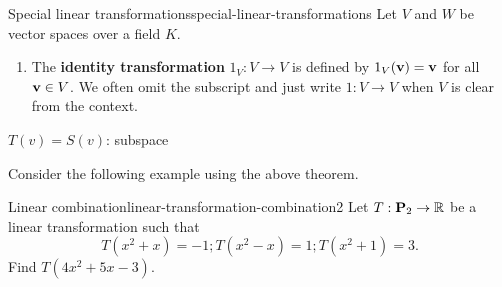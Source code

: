 \begin{definition}{Special linear transformations}{special-linear-transformations}
  Let $V$ and $W$ be vector spaces over a field $K$.
  \begin{enumialphparenastyle}
    \begin{enumerate}
    \item The \textbf{identity transformation}%
      $1_V:V\to V$ is defined by $1_V(\mbox{\bf v})=\mbox{\bf v}$ for all
      $\mbox{\bf v}\in V$. We often omit the subscript and just write
      $1:V\to V$ when $V$ is clear from the context.
    \end{enumerate}
  \end{enumialphparenastyle}
\end{definition}



$T(v) = S(v)$: subspace

Consider the following example using the above theorem.

\begin{example}{Linear combination}{linear-transformation-combination2}
  Let $T:\mathbf{P}_2 \to \mathbb{R}$ be a linear transformation such that
  \begin{equation*}
    T(x^2+x)=-1; T(x^2-x)=1; T(x^2+1)=3.
  \end{equation*}
  Find $T(4x^2+5x-3)$.
\end{example}

